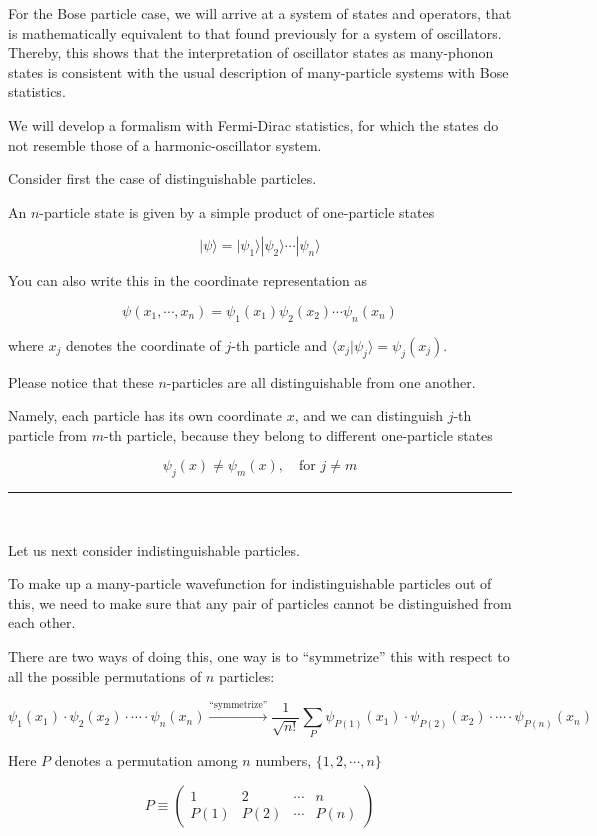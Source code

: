For the Bose particle case, we will arrive at a system of states and operators, that is mathematically equivalent to that found previously for a system of oscillators. Thereby, this shows that the interpretation of oscillator states as many-phonon states is consistent with the usual description of many-particle systems with Bose statistics. 

We will develop a formalism with Fermi-Dirac statistics, for which the states do not resemble those of a harmonic-oscillator system. 

Consider first the case of distinguishable particles. 

An $n$-particle state is given by a simple product of one-particle states

\[|\psi\rangle = |\psi_1\rangle|\psi_2\rangle\cdots|\psi_n\rangle \]

You can also write this in the coordinate representation as 

\[\psi(x_1,\cdots,x_n) = \psi_1(x_1)\psi_2(x_2)\cdots\psi_n(x_n) \]

where $x_j$ denotes the coordinate of $j$-th particle and $\langle x_j|\psi_j\rangle = \psi_j(x_j)$. 

Please notice that these $n$-particles are all distinguishable from one another. 

Namely, each particle has its own coordinate $x$, and we can distinguish $j$-th particle from $m$-th particle, because they belong to different one-particle states

\[\psi_j(x) \neq \psi_m(x),\quad \text{for }j\neq m \]

\hrule

\ 

Let us next consider indistinguishable particles. 

To make up a many-particle wavefunction for indistinguishable particles out of this, we need to make sure that any pair of particles cannot be distinguished from each other. 

There are two ways of doing this, one way is to ``symmetrize'' this with respect to all the possible permutations of $n$ particles:

\[\psi_1(x_1)\cdot\psi_2(x_2)\cdot\cdots\cdot\psi_n(x_n)\overset{\text{``symmetrize''}}{\longrightarrow}\frac{1}{\sqrt{n!}}\sum_P \psi_{P(1)}(x_1)\cdot\psi_{P(2)}(x_2)\cdot\cdots\cdot\psi_{P(n)}(x_n) \]

Here $P$ denotes a permutation among $n$ numbers, $\{1,2,\cdots,n\}$

\[P \equiv\left(
\begin{matrix}
1 & 2 & \cdots & n\\
P(1) & P(2) & \cdots & P(n)
\end{matrix}
\right) \]

